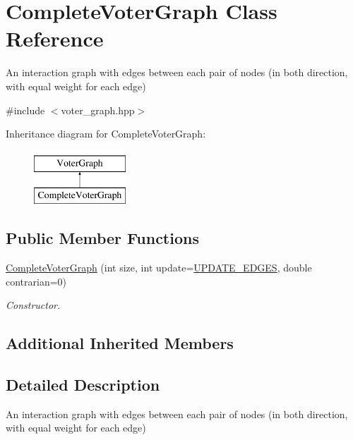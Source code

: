 \hypertarget{class_complete_voter_graph}{}\section{Complete\+Voter\+Graph Class Reference}
\label{class_complete_voter_graph}


An interaction graph with edges between each pair of nodes (in both direction, with equal weight for each edge)  




{\ttfamily \#include $<$voter\+\_\+graph.\+hpp$>$}

Inheritance diagram for Complete\+Voter\+Graph\+:\begin{figure}[H]
\begin{center}
\leavevmode
\includegraphics[height=2.000000cm]{class_complete_voter_graph}
\end{center}
\end{figure}
\subsection*{Public Member Functions}
\begin{DoxyCompactItemize}
\item 
\hyperlink{class_complete_voter_graph_a0adf42ee4826aa54e1a13d9b8d770554}{Complete\+Voter\+Graph} (int size, int update=\hyperlink{voter__graph_8hpp_a305d80651467e931f258a3686976d31c}{U\+P\+D\+A\+T\+E\+\_\+\+E\+D\+G\+E\+S}, double contrarian=0)
\begin{DoxyCompactList}\small\item\em Constructor. \end{DoxyCompactList}\end{DoxyCompactItemize}
\subsection*{Additional Inherited Members}


\subsection{Detailed Description}
An interaction graph with edges between each pair of nodes (in both direction, with equal weight for each edge) 

